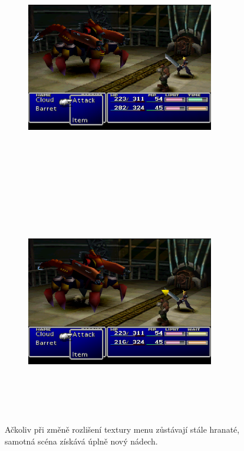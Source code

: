 \begin{figure}[hbt]
    \centering
    \begin{subfigure}{0.9\textwidth}
        \centering
        \includegraphics[width=0.9\textwidth, height=10cm]{obrazky-figures/ff7-lowres.png}\vspace*{2mm}
    \end{subfigure}
    \begin{subfigure}{0.9\textwidth}
        \centering
        \includegraphics[width=0.9\textwidth, height=10cm]{obrazky-figures/ff7-highres.png}
    \end{subfigure}
    \caption[Změna rozlišení u hry \textit{Final Fantasy VII}]{Ačkoliv při změně rozlišení textury menu zůstávají stále hranaté, samotná scéna získává úplně nový nádech.}
    \label{ff7-showcase-3}
\end{figure}

